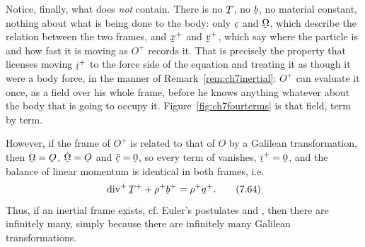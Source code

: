 Notice, finally, what  does \emph{not} contain. There is no
$\bT$, no $\bb$, no material constant, nothing about what is being done
to the body: only $\bc$ and $\bOm$, which describe the relation between
the two frames, and $\bx^{+}$ and $\bv^{+}$, which say where the particle
is and how fast it is moving as $O^{+}$ records it. That is precisely the
property that licenses moving $\vek{i}^{+}$ to the force side of the
equation and treating it as though it were a body force, in the manner of
Remark~\ref{rem:ch7inertial}: $O^{+}$ can evaluate it once, as a field
over his whole frame, before he knows anything whatever about the body
that is going to occupy it. Figure~\ref{fig:ch7fourterms} is that field,
term by term.

However, if the frame of $O^{+}$ is related to
that of $O$ by a Galilean transformation, then $\bOm=\Ob$, $\dot\bOm=\Ob$
and $\ddot\bc=\bze$, so every term of  vanishes,
$\vek{i}^{+}=\bze$, and the balance of linear momentum is identical in
both frames, i.e.
\begin{equation}
   \dvg^{+}\bT^{+}+\rho^{+}\bb^{+}=\rho^{+}\ba^{+}.
   \tag{7.64}\label{eq:7.64}
\end{equation}
Thus, if an inertial frame exists, cf. Euler's postulates  and
, then there are infinitely many, simply because there are
infinitely many Galilean transformations.

